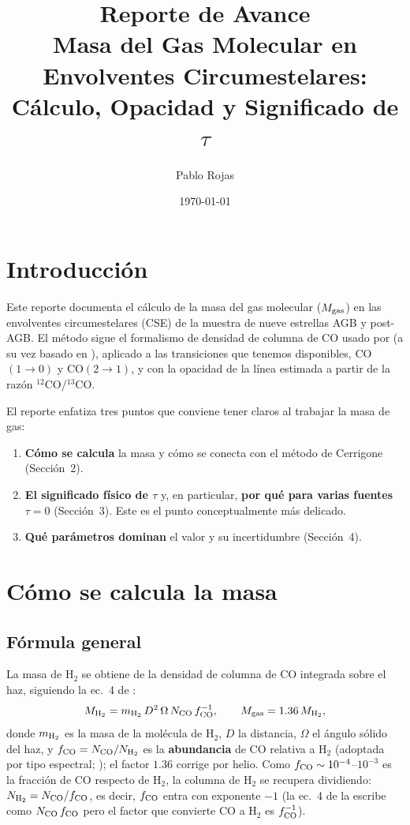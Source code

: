 \documentclass[12pt, a4paper]{article}
\title{
    \textbf{Reporte de Avance}\\[0.5em]
    \large Masa del Gas Molecular en Envolventes Circumestelares:\\
    Cálculo, Opacidad y Significado de $\tau$
}
\author{Pablo Rojas}
\date{\today}
\begin{document}
\maketitle
\tableofcontents
\newpage

\section{Introducción}

Este reporte documenta el cálculo de la masa del gas molecular ($M_{\rm gas}$) en las
envolventes circumestelares (CSE) de la muestra de nueve estrellas AGB y post-AGB.
El método sigue el formalismo de densidad de columna de CO usado por
\citet{cerrigone2012} (a su vez basado en \citealp{choi1993}), aplicado a las transiciones
que tenemos disponibles, CO$(1\to0)$ y CO$(2\to1)$, y con la opacidad de la línea estimada
a partir de la razón $^{12}$CO/$^{13}$CO.

El reporte enfatiza tres puntos que conviene tener claros al trabajar la masa de gas:
\begin{enumerate}
    \item \textbf{Cómo se calcula} la masa y cómo se conecta con el método de Cerrigone (Sección~2).
    \item \textbf{El significado físico de $\tau$} y, en particular, \textbf{por qué para varias
    fuentes $\tau = 0$} (Sección~3). Este es el punto conceptualmente más delicado.
    \item \textbf{Qué parámetros dominan} el valor y su incertidumbre (Sección~4).
\end{enumerate}

\section{Cómo se calcula la masa}

\subsection{Fórmula general}

La masa de H$_2$ se obtiene de la densidad de columna de CO integrada sobre el haz,
siguiendo la ec.~4 de \citet{cerrigone2012}:
\begin{equation}
    M_{{\rm H}_2} = m_{{\rm H}_2}\, D^2\, \Omega\, N_{\rm CO}\, f_{\rm CO}^{-1},
    \qquad M_{\rm gas} = 1.36\,M_{{\rm H}_2},
    \label{eq:Mmain}
\end{equation}
donde $m_{{\rm H}_2}$ es la masa de la molécula de H$_2$, $D$ la distancia, $\Omega$ el ángulo
sólido del haz, y $f_{\rm CO}=N_{\rm CO}/N_{\rm H_2}$ es la \textbf{abundancia} de CO relativa a
H$_2$ (adoptada por tipo espectral; \citealp{ramstedt2008}); el factor $1.36$ corrige por helio.
Como $f_{\rm CO}\sim10^{-4}$--$10^{-3}$ es la fracción de CO respecto de H$_2$, la columna de
H$_2$ se recupera dividiendo: $N_{\rm H_2}=N_{\rm CO}/f_{\rm CO}$, es decir, $f_{\rm CO}$ entra
con exponente $-1$ (la ec.~4 de \citealp{cerrigone2012} la escribe como $N_{\rm CO}\,f_{\rm CO}$
pero el factor que convierte CO a H$_2$ es $f_{\rm CO}^{-1}$).
\end{document}
